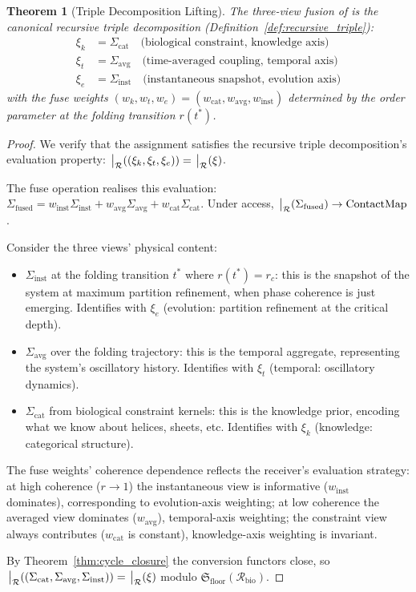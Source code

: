 \documentclass[11pt,twocolumn,a4paper]{article}
\newtheorem{theorem}{Theorem}[section]
\theoremstyle{definition}
\theoremstyle{remark}
\newcommand{\Recv}{\mathcal{R}}
\newcommand{\Floor}{{\mathfrak{S}_{\mathrm{floor}}}}
\newcommand{\Sexp}{\xi}
\newcommand{\Sig}{\Sigma}
\begin{document}
\begin{theorem}[Triple Decomposition Lifting]
\label{thm:triple_lift}
The three-view fusion of \citep{sachikonye2025fold} is the canonical recursive triple decomposition (Definition~\ref{def:recursive_triple}):
\begin{align}
\Sexp_k &= \Sig_{\mathrm{cat}} \quad \text{(biological constraint, knowledge axis)} \\
\Sexp_t &= \Sig_{\mathrm{avg}} \quad \text{(time-averaged coupling, temporal axis)} \\
\Sexp_e &= \Sig_{\mathrm{inst}} \quad \text{(instantaneous snapshot, evolution axis)}
\end{align}
with the fuse weights $(w_k, w_t, w_e) = (w_{\mathrm{cat}}, w_{\mathrm{avg}}, w_{\mathrm{inst}})$ determined by the order parameter at the folding transition $r(t^*)$.
\end{theorem}

\begin{proof}
We verify that the assignment satisfies the recursive triple decomposition's evaluation property: $\eval_\Recv((\Sexp_k, \Sexp_t, \Sexp_e)) = \eval_\Recv(\Sexp)$.

The fuse operation realises this evaluation: $\Sig_{\mathrm{fused}} = w_{\mathrm{inst}} \Sig_{\mathrm{inst}} + w_{\mathrm{avg}} \Sig_{\mathrm{avg}} + w_{\mathrm{cat}} \Sig_{\mathrm{cat}}$. Under access, $\eval_\Recv(\Sig_{\mathrm{fused}}) \to \mathrm{ContactMap}$.

Consider the three views' physical content:
\begin{itemize}[nosep]
    \item $\Sig_{\mathrm{inst}}$ at the folding transition $t^*$ where $r(t^*) = r_c$: this is the snapshot of the system at maximum partition refinement, when phase coherence is just emerging. Identifies with $\Sexp_e$ (evolution: partition refinement at the critical depth).
    \item $\Sig_{\mathrm{avg}}$ over the folding trajectory: this is the temporal aggregate, representing the system's oscillatory history. Identifies with $\Sexp_t$ (temporal: oscillatory dynamics).
    \item $\Sig_{\mathrm{cat}}$ from biological constraint kernels: this is the knowledge prior, encoding what we know about helices, sheets, etc. Identifies with $\Sexp_k$ (knowledge: categorical structure).
\end{itemize}

The fuse weights' coherence dependence reflects the receiver's evaluation strategy: at high coherence ($r \to 1$) the instantaneous view is informative ($w_{\mathrm{inst}}$ dominates), corresponding to evolution-axis weighting; at low coherence the averaged view dominates ($w_{\mathrm{avg}}$), temporal-axis weighting; the constraint view always contributes ($w_{\mathrm{cat}}$ is constant), knowledge-axis weighting is invariant.

By Theorem~\ref{thm:cycle_closure} the conversion functors close, so $\eval_\Recv((\Sig_{\mathrm{cat}}, \Sig_{\mathrm{avg}}, \Sig_{\mathrm{inst}})) = \eval_\Recv(\Sexp)$ modulo $\Floor(\Recv_{\mathrm{bio}})$.
\end{proof}
\end{document}
